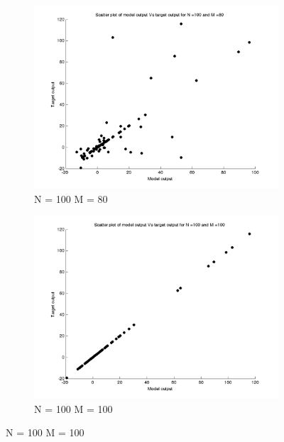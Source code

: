 \documentclass{article}
\begin{document}
\begin{figure}[H]
\begin{subfigure}{.5\textwidth}
\centering
\includegraphics[width=\linewidth]{D2/Scatter/VaryingM_N100M80}
\caption{N = 100 M = 80}
\end{subfigure}
\begin{subfigure}{.5\textwidth}
\includegraphics[width=\linewidth]{D2/Scatter/VaryingM_N100M100}
\caption{N = 100 M = 100}
\end{subfigure}


\end{figure}
\end{document}
